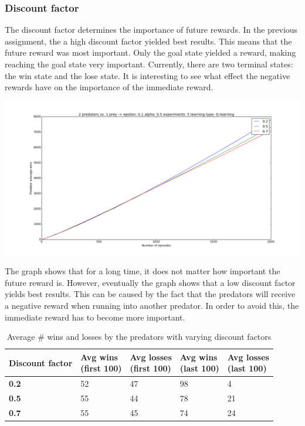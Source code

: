 \subsubsection{Discount factor}
The discount factor determines the importance of future rewards. In the previous assignment, the a high discount factor yielded best results. This means that the future reward was most important. Only the goal state yielded a reward, making reaching the goal state very important. Currently, there are two terminal states: the win state and the lose state. It is interesting to see what effect the negative rewards have on the importance of the immediate reward.

\begin{center}
	\includegraphics[scale=0.3]{2_predators_discount_factor_q_learning}
\end{center}

The graph shows that for a long time, it does not matter how important the future reward is. However, eventually the graph shows that a low discount factor yields best results. This can be caused by the fact that the predators will receive a negative reward when running into another predator. In order to avoid this, the immediate reward has to become more important.

\begin{table}[H]
\begin{center}
\begin{tabular}{| l | l | l | l | l |}
\hline
\parbox{2cm}{\textbf{Discount factor}} & \parbox{2cm}{\textbf{Avg wins \\ (first 100)}} & \parbox{2cm}{\textbf{Avg losses \\ (first 100)}} & \parbox{2cm}{\textbf{Avg wins \\ (last 100)}} & \parbox{2cm}{\textbf{Avg losses \\ (last 100)}} \\
\hline
\textbf{0.2} & 52 & 47 & 98 & 4 \\
\hline
\textbf{0.5} & 55 & 44 & 78 & 21 \\
\hline
\textbf{0.7} & 55 & 45 & 74 & 24 \\
\hline
\end{tabular}
\caption{Average \# wins and losses by the predators with varying discount factors}
\end{center}
\end{table}

